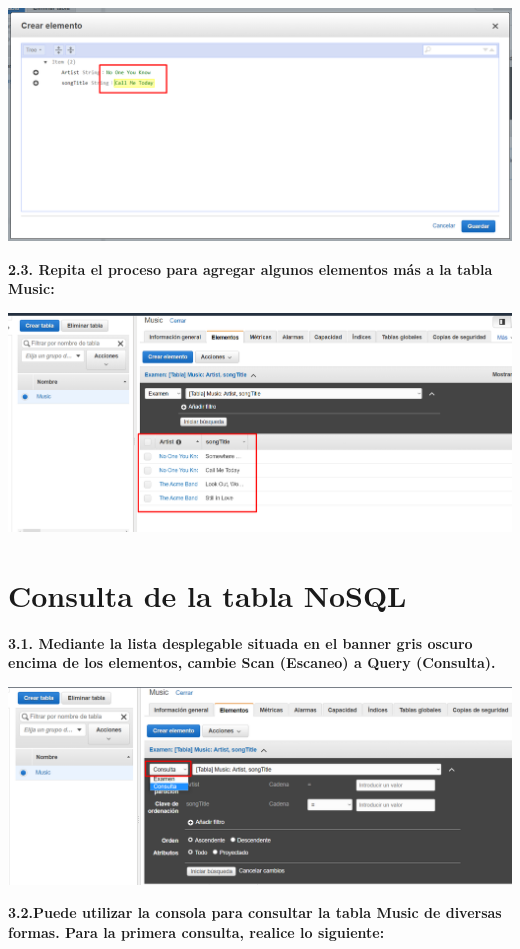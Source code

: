 \documentclass{article}
\begin{document}
    \begin{center}
		\includegraphics[width=15cm]{./images/8} 
	\end{center}
\textbf{2.3. Repita el proceso para agregar algunos elementos más a la tabla Music:
}
 \begin{center}
		\includegraphics[width=15cm]{./images/9} 
	\end{center}
	
	\newpage

\section{Consulta de la tabla NoSQL }

\textbf{3.1. Mediante la lista desplegable situada en el banner gris oscuro encima de los elementos, cambie Scan (Escaneo) a Query (Consulta). }

    \begin{center}
		\includegraphics[width=15cm]{./images/10} 
	\end{center}
\textbf{3.2.Puede utilizar la consola para consultar la tabla Music de diversas formas. Para la primera consulta, realice lo siguiente: }
\end{document}
